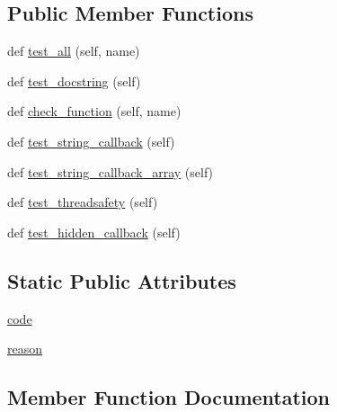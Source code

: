 \subsection*{Public Member Functions}
\begin{DoxyCompactItemize}
\item 
def \hyperlink{classnumpy_1_1f2py_1_1tests_1_1test__callback_1_1TestF77Callback_a253c0987535baff9e2035bfd11569354}{test\+\_\+all} (self, name)
\item 
def \hyperlink{classnumpy_1_1f2py_1_1tests_1_1test__callback_1_1TestF77Callback_afac32d4cd6ecf6c14c08bae9183562ae}{test\+\_\+docstring} (self)
\item 
def \hyperlink{classnumpy_1_1f2py_1_1tests_1_1test__callback_1_1TestF77Callback_a5f82ec9a79d94a43d4e54e5aa0db30b9}{check\+\_\+function} (self, name)
\item 
def \hyperlink{classnumpy_1_1f2py_1_1tests_1_1test__callback_1_1TestF77Callback_ad40a7494b90706b774f4e02ed70d90f7}{test\+\_\+string\+\_\+callback} (self)
\item 
def \hyperlink{classnumpy_1_1f2py_1_1tests_1_1test__callback_1_1TestF77Callback_aa676ca11eb51ea30c9e48cc6b4090888}{test\+\_\+string\+\_\+callback\+\_\+array} (self)
\item 
def \hyperlink{classnumpy_1_1f2py_1_1tests_1_1test__callback_1_1TestF77Callback_ad30828443567179ecc5ef37e74888ace}{test\+\_\+threadsafety} (self)
\item 
def \hyperlink{classnumpy_1_1f2py_1_1tests_1_1test__callback_1_1TestF77Callback_af019468f8055e3a084d8805cfc90e206}{test\+\_\+hidden\+\_\+callback} (self)
\end{DoxyCompactItemize}
\subsection*{Static Public Attributes}
\begin{DoxyCompactItemize}
\item 
\hyperlink{classnumpy_1_1f2py_1_1tests_1_1test__callback_1_1TestF77Callback_a5737c6950ee3925d1d2648b7034ef2f3}{code}
\item 
\hyperlink{classnumpy_1_1f2py_1_1tests_1_1test__callback_1_1TestF77Callback_abe546401c603df5719b1edd0520c9416}{reason}
\end{DoxyCompactItemize}


\subsection{Member Function Documentation}
\mbox{\label{classnumpy_1_1f2py_1_1tests_1_1test__callback_1_1TestF77Callback_a5f82ec9a79d94a43d4e54e5aa0db30b9}} 
